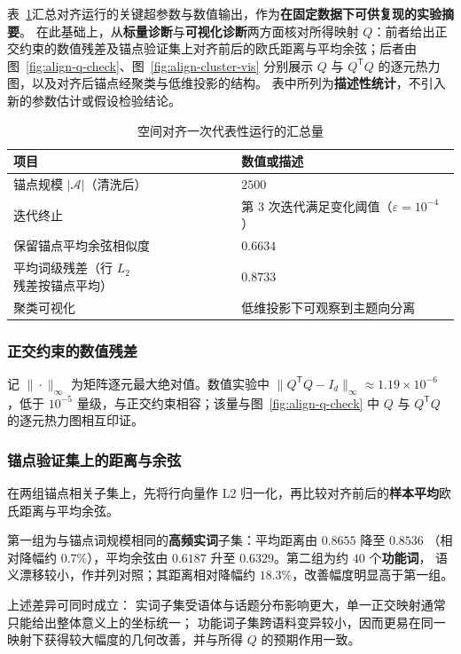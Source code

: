 \documentclass[withoutpreface]{cumcmthesis}
\begin{document}
表~\ref{tab:align-run}汇总对齐运行的关键超参数与数值输出，作为\textbf{在固定数据下可供复现的实验摘要}。
在此基础上，从\textbf{标量诊断}与\textbf{可视化诊断}两方面核对所得映射 $Q$：前者给出正交约束的数值残差及锚点验证集上对齐前后的欧氏距离与平均余弦；后者由图~\ref{fig:align-q-check}、图~\ref{fig:align-cluster-vis} 分别展示 $Q$ 与 $Q^{\mathsf{T}}Q$ 的逐元热力图，以及对齐后锚点经聚类与低维投影的结构。
表中所列为\textbf{描述性统计}，不引入新的参数估计或假设检验结论。

\begin{table}[!htbp]
  \centering
  \caption{空间对齐一次代表性运行的汇总量}
  \label{tab:align-run}
  \begin{tabular}{@{}ll@{}}
    \toprule
    项目 & 数值或描述 \\
    \midrule
    锚点规模 $|\mathcal{A}|$（清洗后） & $2500$ \\
    迭代终止 & 第 $3$ 次迭代满足变化阈值（$\varepsilon=10^{-4}$） \\
    保留锚点平均余弦相似度 & $0.6634$ \\
    平均词级残差（行 $L_2$ 残差按锚点平均） & $0.8733$ \\
    聚类可视化 & 低维投影下可观察到主题向分离 \\
    \bottomrule
  \end{tabular}
\end{table}

\subsubsection{正交约束的数值残差}
记 $\|\cdot\|_\infty$ 为矩阵逐元最大绝对值。数值实验中 $\|Q^{\mathsf{T}}Q-I_d\|_\infty\approx 1.19\times10^{-6}$
，低于 $10^{-5}$ 量级，与正交约束相容；该量与图~\ref{fig:align-q-check} 中 $Q$ 与 $Q^{\mathsf{T}}Q$ 的逐元热力图相互印证。

\subsubsection{锚点验证集上的距离与余弦}
在两组锚点相关子集上，先将行向量作 L2 归一化，再比较对齐前后的\textbf{样本平均}欧氏距离与平均余弦。

第一组为与锚点词规模相同的\textbf{高频实词}子集：平均距离由 $0.8655$ 降至 $0.8536$
（相对降幅约 $0.7\%$），平均余弦由 $0.6187$ 升至 $0.6329$。第二组为约 $40$ 个\textbf{功能词}，
语义漂移较小，作并列对照；其距离相对降幅约 $18.3\%$，改善幅度明显高于第一组。

上述差异可同时成立：
实词子集受语体与话题分布影响更大，单一正交映射通常只能给出整体意义上的坐标统一；
功能词子集跨语料变异较小，因而更易在同一映射下获得较大幅度的几何改善，并与所得 $Q$ 的预期作用一致。
\end{document}
